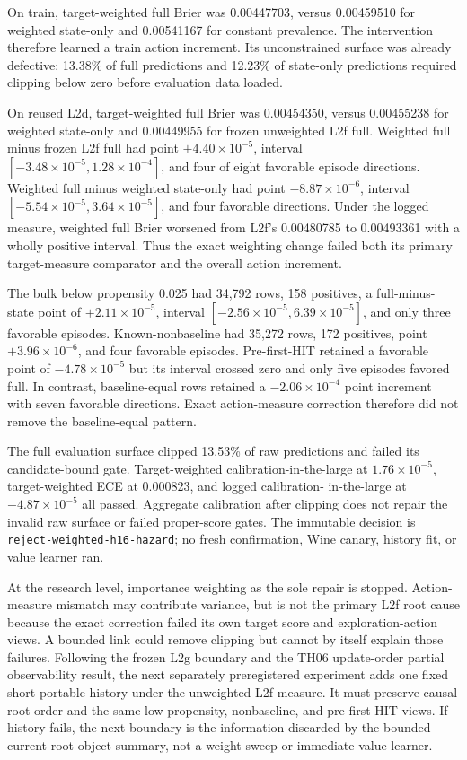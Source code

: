\documentclass[11pt]{article}
\begin{document}
On train, target-weighted full Brier was 0.00447703, versus 0.00459510 for
weighted state-only and 0.00541167 for constant prevalence.  The intervention
therefore learned a train action increment.  Its unconstrained surface was
already defective: 13.38\% of full predictions and 12.23\% of state-only
predictions required clipping below zero before evaluation data loaded.

On reused L2d, target-weighted full Brier was 0.00454350, versus 0.00455238 for
weighted state-only and 0.00449955 for frozen unweighted L2f full.  Weighted
full minus frozen L2f full had point $+4.40\times10^{-5}$, interval
$[-3.48\times10^{-5},1.28\times10^{-4}]$, and four of eight favorable episode
directions.  Weighted full minus weighted state-only had point
$-8.87\times10^{-6}$, interval
$[-5.54\times10^{-5},3.64\times10^{-5}]$, and four favorable directions.  Under
the logged measure, weighted full Brier worsened from L2f's 0.00480785 to
0.00493361 with a wholly positive interval.  Thus the exact weighting change
failed both its primary target-measure comparator and the overall action
increment.

The bulk below propensity 0.025 had 34,792 rows, 158 positives, a
full-minus-state point of $+2.11\times10^{-5}$, interval
$[-2.56\times10^{-5},6.39\times10^{-5}]$, and only three favorable episodes.
Known-nonbaseline had 35,272 rows, 172 positives, point
$+3.96\times10^{-6}$, and four favorable episodes.  Pre-first-HIT retained a
favorable point of $-4.78\times10^{-5}$ but its interval crossed zero and only
five episodes favored full.  In contrast, baseline-equal rows retained a
$-2.06\times10^{-4}$ point increment with seven favorable directions.  Exact
action-measure correction therefore did not remove the baseline-equal pattern.

The full evaluation surface clipped 13.53\% of raw predictions and failed its
candidate-bound gate.  Target-weighted calibration-in-the-large at
$1.76\times10^{-5}$, target-weighted ECE at 0.000823, and logged calibration-
in-the-large at $-4.87\times10^{-5}$ all passed.  Aggregate calibration after
clipping does not repair the invalid raw surface or failed proper-score gates.
The immutable decision is \texttt{reject-weighted-h16-hazard}; no fresh
confirmation, Wine canary, history fit, or value learner ran.

At the research level, importance weighting as the sole repair is stopped.
Action-measure mismatch may contribute variance, but is not the primary L2f
root cause because the exact correction failed its own target score and
exploration-action views.  A bounded link could remove clipping but cannot by
itself explain those failures.  Following the frozen L2g boundary and the TH06
update-order partial observability result, the next separately preregistered
experiment adds one fixed short portable history under the unweighted L2f
measure.  It must preserve causal root order and the same low-propensity,
nonbaseline, and pre-first-HIT views.  If history fails, the next boundary is
the information discarded by the bounded current-root object summary, not a
weight sweep or immediate value learner.
\end{document}
